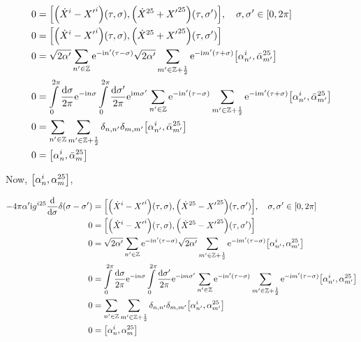 \begin{align*}
    0&=\comm{\qty({\dot X}^i-{X'}^i)\qty(\tau,\sigma)}{\qty({\dot X}^{25}+{X'}^{25})\qty(\tau,\sigma')},\ \ \ \sigma,\sigma'\in\qty[0,2\pi]\\
    0&=\comm{\qty({\dot X}^i-{X'}^i)\qty(\tau,\sigma)}{\qty({\dot X}^{25}+{X'}^{25})\qty(\tau,\sigma')}\\
    0&=\sqrt{2\alpha'}\sum\limits_{n'\in\mathbb Z}\e^{-\im n'\qty(\tau-\sigma)}\sqrt{2\alpha'}\sum\limits_{m'\in\mathbb Z+\frac12}\e^{-\im m'\qty(\tau+\sigma)}\comm{\alpha^i_{n'}}{{\bar\alpha}^{25}_{m'}}\\
    0&=\int\limits_0^{2\pi}\frac{\dd{\sigma}}{2\pi}\e^{-\im n\sigma}\int\limits_0^{2\pi}\frac{\dd{\sigma'}}{2\pi}\e^{\im m\sigma'}\sum\limits_{n'\in\mathbb Z}\e^{-\im n'\qty(\tau-\sigma)}\sum\limits_{m'\in\mathbb Z+\frac12}\e^{-\im m'\qty(\tau+\sigma)}\comm{\alpha^i_{n'}}{{\bar\alpha}^{25}_{m'}}\\
    0&=\sum\limits_{n'\in\mathbb Z}\sum\limits_{m'\in\mathbb Z+\frac12}\delta_{n,n'}\delta_{m,m'}\comm{\alpha^i_{n'}}{{\bar\alpha}^{25}_{m'}}\\
    0&=\comm{\alpha^i_{n}}{{\bar\alpha}^{25}_{m}}
\end{align*}

Now, $\comm{\alpha_n^i}{{\alpha}_m^{25}}$,

\begin{align*}
    -4\pi\alpha'\im g^{i25}\dv{}{\sigma}\delta\qty(\sigma-\sigma')&=\comm{\qty({\dot X}^i-{X'}^i)\qty(\tau,\sigma)}{\qty({\dot X}^{25}-{X'}^{25})\qty(\tau,\sigma')},\ \ \ \sigma,\sigma'\in\qty[0,2\pi]\\
    0&=\comm{\qty({\dot X}^i-{X'}^i)\qty(\tau,\sigma)}{\qty({\dot X}^{25}-{X'}^{25})\qty(\tau,\sigma')}\\
    0&=\sqrt{2\alpha'}\sum\limits_{n'\in\mathbb Z}\e^{-\im n'\qty(\tau-\sigma)}\sqrt{2\alpha'}\sum\limits_{m'\in\mathbb Z+\frac12}\e^{-\im m'\qty(\tau-\sigma)}\comm{\alpha^i_{n'}}{{\alpha}^{25}_{m'}}\\
    0&=\int\limits_0^{2\pi}\frac{\dd{\sigma}}{2\pi}\e^{-\im n\sigma}\int\limits_0^{2\pi}\frac{\dd{\sigma'}}{2\pi}\e^{-\im m\sigma'}\sum\limits_{n'\in\mathbb Z}\e^{-\im n'\qty(\tau-\sigma)}\sum\limits_{m'\in\mathbb Z+\frac12}\e^{-\im m'\qty(\tau-\sigma)}\comm{\alpha^i_{n'}}{{\alpha}^{25}_{m'}}\\
    0&=\sum\limits_{n'\in\mathbb Z}\sum\limits_{m'\in\mathbb Z+\frac12}\delta_{n,n'}\delta_{m,m'}\comm{\alpha^i_{n'}}{{\alpha}^{25}_{m'}}\\
    0&=\comm{\alpha^i_{n}}{{\alpha}^{25}_{m}}
\end{align*}

